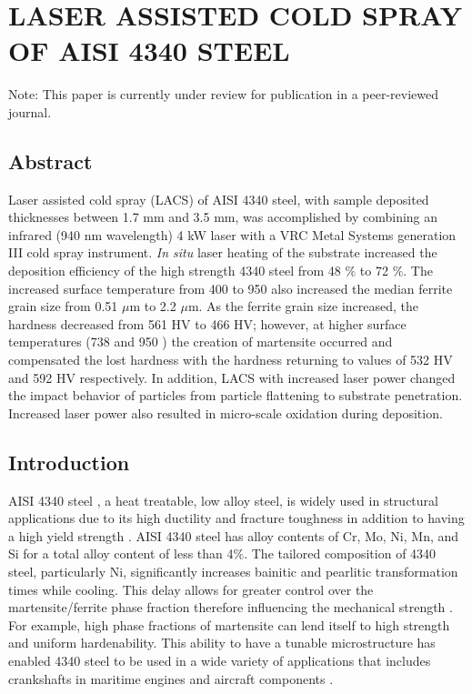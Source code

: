 \chapter{LASER ASSISTED COLD SPRAY OF AISI 4340 STEEL}


Note: This paper is currently under review for publication in a peer-reviewed journal.

\section*{Abstract}

Laser assisted cold spray (LACS) of AISI 4340 steel, with sample deposited thicknesses between 1.7 mm and 3.5 mm, was accomplished by combining an infrared (940 nm wavelength) 4 kW laser with a VRC Metal Systems generation III cold spray instrument. \textit{In situ} laser heating of the substrate increased the deposition efficiency of the high strength 4340 steel from 48 $\%$ to 72 $\%$. The increased surface temperature from 400 \celsius{} to 950 \celsius{} also increased the median ferrite grain size from 0.51 $\mu$m to 2.2 $\mu$m. As the ferrite grain size increased, the hardness decreased from 561 HV to 466 HV; however, at higher surface temperatures (738 \celsius{} and 950 \celsius{}) the creation of martensite occurred and compensated the lost hardness with the hardness returning to values of 532 HV and 592 HV respectively. In addition, LACS with increased laser power changed the impact behavior of particles from particle flattening to substrate penetration. Increased laser power also resulted in micro-scale oxidation during deposition.



\section*{Introduction}


AISI 4340 steel \cite{RN2268}, a heat treatable, low alloy steel, is widely used in structural applications due to its high ductility and fracture toughness in addition to having a high yield strength \cite{RN1418}. AISI 4340 steel has alloy contents of Cr, Mo, Ni, Mn, and Si for a total alloy content of less than 4$\%$. The tailored composition of 4340 steel, particularly Ni, significantly increases bainitic and pearlitic transformation times while cooling. This delay allows for greater control over the martensite/ferrite phase fraction therefore influencing the mechanical strength \cite{RN2269}. For example, high phase fractions of martensite can lend itself to high strength and uniform hardenability. This ability to have a tunable microstructure has enabled 4340 steel to be used in a wide variety of applications that includes crankshafts in maritime engines and aircraft components \cite{RN3385,RN1427}.



